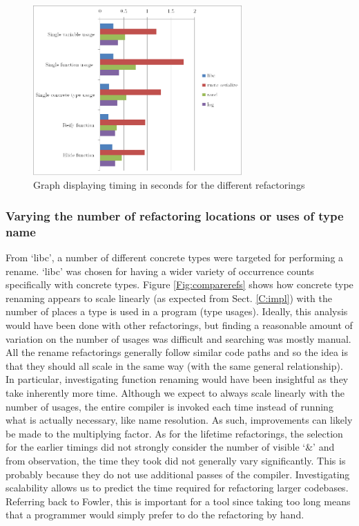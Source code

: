 \begin{figure}[h]
\begin{center}

\includegraphics[width=8cm]{refactorings}

\caption{Graph displaying timing in seconds for the different refactorings}
\label{Fig:compareref}
\end{center}
\end{figure}

\subsubsection{Varying the number of refactoring locations or uses of type name}
From `libc', a number of different concrete types were targeted for performing a rename. `libc' was chosen for having a wider variety of occurrence counts specifically with concrete types. Figure \ref{Fig:comparerefs} shows how concrete type renaming appears to scale linearly (as expected from Sect. \ref{C:impl}) with the number of places a type is used in a program (type usages). Ideally, this analysis would have been done with other refactorings, but finding a reasonable amount of variation on the number of usages was difficult and searching was mostly manual. All the rename refactorings generally follow similar code paths and so the idea is that they should all scale in the same way (with the same general relationship). In particular, investigating function renaming would have been insightful as they take inherently more time. Although we expect to always scale linearly with the number of usages, the entire compiler is invoked each time instead of running what is actually necessary, like name resolution. As such, improvements can likely be made to the multiplying factor. As for the lifetime refactorings, the selection for the earlier timings did not strongly consider the number of visible `\&' and from observation, the time they took did not generally vary significantly. This is probably because they do not use additional passes of the compiler. Investigating scalability allows us to predict the time required for refactoring larger codebases. Referring back to Fowler, this is important for a tool since taking too long means that a programmer would simply prefer to do the refactoring by hand.

